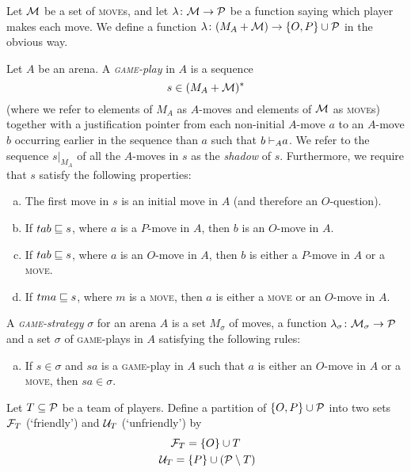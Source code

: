 \documentclass{article}
\newcommand{\game}{\textsc{game}}
\newcommand{\move}{\textsc{move}}
\begin{document}
\begin{definition}
  Let $\M$ be a set of \move{}s, and let $\lambda\from\M\to\P$ be a function saying which player makes each move.  We define a function $\lambda\from (M_A+\M)\to\OP\cup \P$ in the obvious way.  

  Let $A$ be an arena.  
  A \emph{\game{}-play} in $A$ is a sequence
  \[
    s \in (M_A + \M)^*
    \]
  (where we refer to elements of $M_A$ as $A$-moves and elements of $\M$ as \move{}s) together with a justification pointer from each non-initial $A$-move $a$ to an $A$-move $b$ occurring earlier in the sequence than $a$ such that $b\ts_A a$.  
  We refer to the sequence $s\vert_{M_A}$ of all the $A$-moves in $s$ as the \emph{shadow} of $s$.
  Furthermore, we require that $s$ satisfy the following properties:
  \begin{enumerate}[a)]
    \item The first move in $s$ is an initial move in $A$ (and therefore an $O$-question).
    \item If $tab\prefix s$, where $a$ is a $P$-move in $A$, then $b$ is an $O$-move in $A$.
    \item If $tab\prefix s$, where $a$ is an $O$-move in $A$, then $b$ is either a $P$-move in $A$ or a \move{}.
    \item If $tma\prefix s$, where $m$ is a \move{}, then $a$ is either a \move{} or an $O$-move in $A$.
  \end{enumerate}
\end{definition}

\begin{definition}
  A \emph{\game{}-strategy} $\sigma$ for an arena $A$ is a set $M_\sigma$ of moves, a function $\lambda_\sigma\from \M_\sigma\to\P$ and a set $\sigma$ of \game{}-plays in $A$ satisfying the following rules:
  \begin{enumerate}[a)]
    \item If $s\in\sigma$ and $sa$ is a \game{}-play in $A$ such that $a$ is either an $O$-move in $A$ or a \move{}, then $sa\in\sigma$.
  \end{enumerate}
\end{definition}

  Let $T\subset\P$ be a team of players.  
  Define a partition of $\OP\cup\P$ into two sets $\F_T$ (`friendly') and $\U_T$ (`unfriendly') by
  \begin{gather*}
    \F_T = \{O\} \cup T \\\
    \U_T = \{P\} \cup (\P \setminus T)
  \end{gather*}
\end{document}
